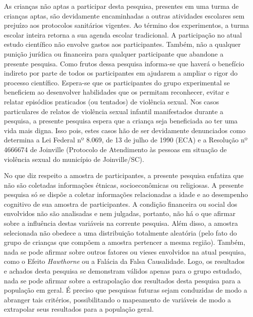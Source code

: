 As crianças não aptas a participar desta pesquisa, presentes em uma turma de crianças aptas, são devidamente encaminhadas a outras atividades escolares sem prejuízo aos protocolos sanitários vigentes. %
Ao término dos experimentos, a turma escolar inteira retorna a sua agenda escolar tradicional. A participação no atual estudo científico não envolve gastos aos participantes. Também, não a qualquer punição jurídica ou financeira para qualquer participante que abandone a presente pesquisa. Como frutos dessa pesquisa informa-se que haverá o benefício indireto por parte de todos os participantes em ajudarem a ampliar o rigor do processo científico. Espera-se que os participantes do grupo experimental se beneficiem ao desenvolver habilidades que os permitam reconhecer, evitar e relatar episódios praticados (ou tentados) de violência sexual. Nos casos particulares de relatos de violência sexual infantil manifestados durante a pesquisa, a presente pesquisa espera que a criança seja beneficiada ao ter uma vida mais digna. Isso pois, estes casos hão de ser devidamente denunciados como determina a Lei Federal nº 8.069, de 13 de julho de 1990 (\ac{ECA}) e a Resolução nº 4666674 de Joinville (Protocolo de Atendimento às pessoas em situação de violência sexual do município de Joinville/SC). 

No que diz respeito a amostra de participantes, a presente pesquisa enfatiza que não são coletadas informações étnicas, socioeconômicas ou religiosas. A presente pesquisa só se dispõe a coletar informações relacionadas a idade e ao desempenho cognitivo de sua amostra de participantes. A condição financeira ou social dos envolvidos não são analisadas e nem julgadas, portanto, não há o que afirmar sobre a influência destas variáveis na corrente pesquisa. Além disso, a amostra selecionada não obedece a uma distribuição totalmente aleatória (pelo fato do grupo de crianças que compõem a amostra pertencer a mesma região). Também, nada se pode afirmar sobre outros fatores ou vieses envolvidos na atual pesquisa, como o Efeito \textit{Hawthorne} ou a Falácia da Falsa Causalidade. Logo, os resultados e achados desta pesquisa se demonstram válidos apenas para o grupo estudado, nada se pode afirmar sobre a estrapolação dos resultados desta pesquisa para a população em geral. É preciso que pesquisas futuras sejam conduzidas de modo a abranger tais critérios, possibilitando o mapeamento de variáveis de modo a extrapolar seus resultados para a população geral. 

